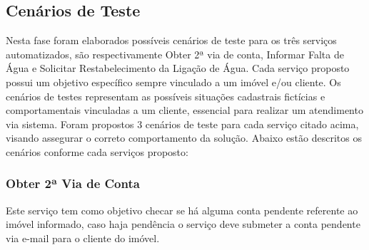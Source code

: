 \subsection{Cenários de Teste}
Nesta fase foram elaborados possíveis cenários de teste para os três serviços automatizados, são respectivamente Obter 2ª via de conta, Informar Falta de Água e Solicitar Restabelecimento da Ligação de Água. Cada serviço proposto possui um objetivo específico sempre vinculado a um imóvel e/ou cliente.
Os cenários de testes representam as possíveis situações cadastrais fictícias e comportamentais vinculadas a um cliente, essencial para realizar um atendimento via sistema. Foram propostos 3 cenários de teste para cada serviço citado acima, visando assegurar o correto comportamento da solução. Abaixo estão descritos os cenários conforme cada serviços proposto:

\subsubsection{Obter 2ª Via de Conta}
Este serviço tem como objetivo checar se há alguma conta pendente referente ao imóvel informado, caso haja pendência o serviço deve submeter a conta pendente via e-mail para o cliente do imóvel. 

